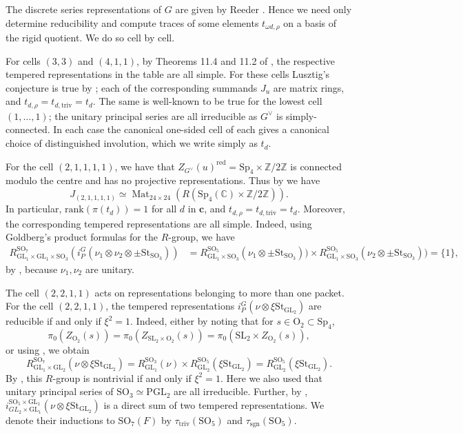 \documentclass[10pt]{article}
\DeclareMathOperator{\Mat}{Mat}
\newcommand{\Z}{\mathbb{Z}}
\newcommand{\C}{\mathbb{C}}
\newcommand{\cc}{\mathbf{c}}
\newcommand{\GL}{\mathrm{GL}}
\newcommand{\PGL}{\mathrm{PGL}}
\newcommand{\SL}{\mathrm{SL}}
\newcommand{\SO}{\mathrm{SO}}
\newcommand{\Sp}{\mathrm{Sp}}
\newcommand{\OO}{\mathrm{O}}
\newcommand{\St}{\mathrm{St}}
\newcommand{\triv}{\mathrm{triv}}
\theoremstyle{definition}
\theoremstyle{remark}
\newcommand{\Gd}{G^\vee}
\newcommand{\Zur}{Z_{G^\vee}(u)^{\mathrm{red}}}
\begin{document}
The discrete series representations of $G$ are given by Reeder \cite{Reeder}. Hence
we need only determine reducibility and compute traces of some elements $t_{\omega d,\rho}$ on a basis of the 
rigid quotient. We do so cell by cell.
 
For cells $(3,3)$ and $(4,1,1)$, by Theorems 11.4 and 11.2 of \cite{Tadic}, the 
respective tempered representations in the table are all simple. For these cells Lusztig's conjecture is 
true by \cite{BO}; each of the corresponding summands $J_u$ are matrix rings, and
$t_{d,\rho}=t_{d,\triv}=t_d$.
The same is well-known to be true for the lowest cell $(1,\dots, 1)$; the unitary
principal series are all irreducible as $\Gd$ is simply-connected. In each case the canonical one-sided cell
of each gives a canonical choice of distinguished involution, which we write simply as $t_d$.

For the cell $(2,1,1,1, 1)$, we have that $\Zur=\Sp_4\times\Z/2\Z$ is 
connected modulo the centre and has no projective representations.
Thus by \cite{BO} we have
%
\[
J_{(2,1,1,1, 1)}\simeq\Mat_{24\times 24}(R(\Sp_4(\C)\times\Z/2\Z)).
\]
%
In particular, $\mathrm{rank}(\pi(t_d))=1$ for all $d$ in $\cc$, and $t_{d,\rho}=t_{d,\triv}=t_d$.
Moreover, the corresponding tempered
representations are all simple. Indeed, using Goldberg's product formulas \cite{Goldberg} for the $R$-group, we have
%
\begin{align*}
R_{\GL_1\times\GL_1\times\SO_3}^{\SO_7}(i_P^G(\nu_1\otimes\nu_2\otimes\pm\St_{\SO_3}))&=R_{\GL_1\times\SO_3}^{\SO_5}(\nu_1\otimes\pm\St_{\SO_3}))
\times R_{\GL_1\times\SO_3}^{\SO_5}(\nu_2\otimes\pm\St_{\SO_3}))=\{1\},
\end{align*}
%
by \cite[Prop. 3.2]{Matic}, because $\nu_1,\nu_2$ are unitary.
%

The cell $(2,2,1,1)$ acts on representations belonging to more than one packet.
For the cell $(2,2,1,1)$, the tempered representations 
$i_{P}^G(\nu\otimes\xi\St_{\GL_2})$ are reducible if and only if $\xi^2=1$.
Indeed, either by noting that for $s\in\OO_2\subset \Sp_4$, 
%
\begin{equation}
\label{eq components of centralizers same 2211}
\pi_0(Z_{\OO_2}(s))=\pi_0(Z_{\SL_2\times\OO_2}(s))=\pi_0(\SL_2\times Z_{\OO_2}(s)),
\end{equation}
%
or using \cite{Goldberg}, we obtain
%
\[
R_{\GL_1\times\GL_2}^{\SO_7}(\nu\otimes\xi\St_{\GL_2})=R_{\GL_1}^{\SO_3}(\nu)\times R_{\GL_2}^{\SO_5}(\xi\St_{\GL_2})=R_{\GL_2}^{\SO_5}(\xi\St_{\GL_2}).
\]
%
By \cite[Prop. 3.3]{Matic}, this $R$-group is nontrivial if and only if $\xi^2=1$. Here we also used that unitary principal series of $\SO_3\simeq\PGL_2$ are all irreducible. Further, by \cite{Matic},
$
i_{GL_2\times\GL_1}^{\SO_5\times\GL_1}(\nu\otimes\xi\St_{\GL_2})
$
is a direct sum of two tempered representations. We denote their inductions to $\SO_7(F)$ by 
$\tau_\triv(\SO_5)$ and $\tau_{\mathrm{sgn}}(\SO_5)$. 
\end{document}
